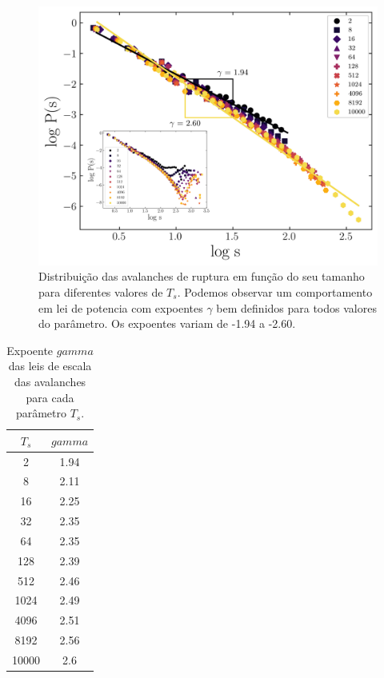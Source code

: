\documentclass{article}
\begin{document}
    \begin{figure}[H]
        \centering
        \includegraphics[width=\textwidth]{figures/ava.png}

        \caption{Distribuição das avalanches de ruptura em função do seu tamanho para diferentes valores de \(T_{s}\).
        Podemos observar um comportamento em lei de potencia com expoentes $\gamma$ bem definidos para todos valores do 
        parâmetro. Os expoentes variam de -1.94 a -2.60.} 

        \label{R7}

    \end{figure}

    \begin{table}[H]
        \begin{tabular}{cc}
        \caption{Expoente \(gamma\) das leis de escala das avalanches para cada parâmetro \(T_{s}\).}
        \hline
        \textbf{\(T_{s}\)} & \textbf{\(gamma\)} \\ \hline
        2                  & 1.94               \\
        8                  & 2.11               \\
        16                 & 2.25               \\
        32                 & 2.35               \\
        64                 & 2.35               \\
        128                & 2.39               \\
        512                & 2.46               \\
        1024               & 2.49               \\
        4096               & 2.51               \\
        8192               & 2.56               \\
        10000              & 2.6                \\ \hline
        \end{tabular}
        \label{tab3}
    \end{table}
\end{document}

